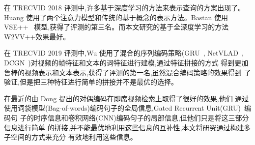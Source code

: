 在 TRECVID 2018 评测中,许多基于深度学习的方法来表示查询的方案出现了。Huang \etal\cite{huang2018informedia}使用了两个注意力模型和传统的基于概念的表示方法。Bastan \etal\cite{bastan2018ntu}使用 VSE++~\cite{faghri2017vse++}
模型,获得了评测的第三名。而本文研究的基于全深度学习的方法 W2VV++效果最好。

在 TRECVID 2019 评测中,Wu \etal\cite{wu2019hybrid}使用了混合的序列编码策略(GRU~\cite{cho2014learning},
NetVLAD~\cite{arandjelovic2016netvlad}, DCGN~\cite{mao2018hierarchical})对视频的帧特征和文本的词特征进行建模,通过特征拼接的方式
得到更加鲁棒的视频表示和文本表示,获得了评测的第一名,虽然混合编码策略的效果得到
了验证,但是把三种特征进行简单的拼接并不是最优的选择。

在最近的由 Dong \etal\cite{dong2019dual}提出的对偶编码在即席视频检索上取得了很好的效果,他们
通过使用词袋模型(Bag-of-words)编码句子的全局信息,Gated Recurrent Unit(GRU)~\cite{cho2014learning}编码句
子的时序信息和卷积网络(CNN)编码句子的局部信息,但他们只是将这三部分信息进行简单
的拼接,并不能最优地利用这些信息的互补性,本文将研究通过构建多子空间的方式来充分
有效地利用这些信息。
